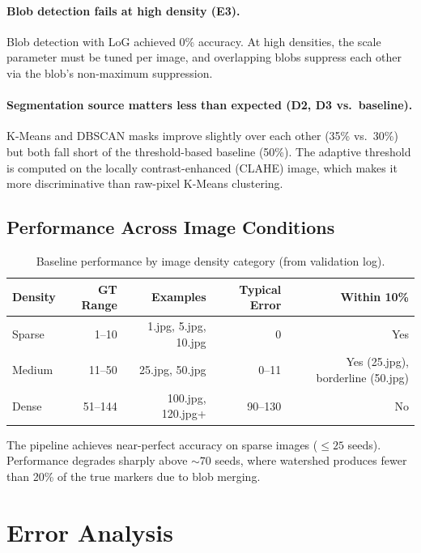 \documentclass[12pt,a4paper]{article}
\begin{document}
\paragraph{Blob detection fails at high density (E3).}
Blob detection with LoG achieved 0\% accuracy. At high densities, the scale
parameter must be tuned per image, and overlapping blobs suppress each other
via the blob's non-maximum suppression.

\paragraph{Segmentation source matters less than expected (D2, D3 vs.\ baseline).}
K-Means and DBSCAN masks improve slightly over each other (35\% vs.\ 30\%)
but both fall short of the threshold-based baseline (50\%). The adaptive
threshold is computed on the locally contrast-enhanced (CLAHE) image, which
makes it more discriminative than raw-pixel K-Means clustering.

\subsection{Performance Across Image Conditions}

\begin{table}[H]
\centering
\caption{Baseline performance by image density category (from validation log).}
\label{tab:density}
\renewcommand{\arraystretch}{1.2}
\begin{tabular}{l r r r r}
\toprule
\textbf{Density} & \textbf{GT Range} & \textbf{Examples} & \textbf{Typical Error} & \textbf{Within 10\%} \\
\midrule
Sparse  & 1--10   & 1.jpg, 5.jpg, 10.jpg  & 0             & Yes \\
Medium  & 11--50  & 25.jpg, 50.jpg         & 0--11         & Yes (25.jpg), borderline (50.jpg) \\
Dense   & 51--144  & 100.jpg, 120.jpg+      & 90--130       & No \\
\bottomrule
\end{tabular}
\end{table}

The pipeline achieves near-perfect accuracy on sparse images ($\leq 25$
seeds). Performance degrades sharply above $\sim\!70$ seeds, where watershed
produces fewer than 20\% of the true markers due to blob merging.

\newpage

\section{Error Analysis}
\end{document}
